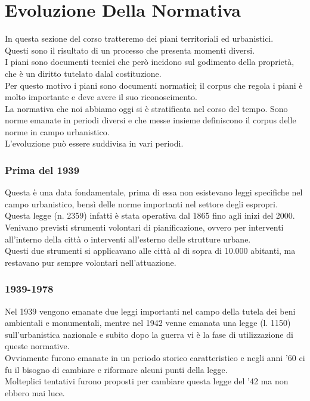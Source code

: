 \documentclass[a4paper,12pt, oneside]{book}
\begin{document}
\chapter{Evoluzione Della Normativa}
In questa sezione del corso tratteremo dei piani territoriali ed urbanistici.\\
Questi sono il risultato di un processo che presenta momenti diversi.\\
I piani sono documenti tecnici che però incidono sul godimento della proprietà, che è un diritto tutelato dalal costituzione.\\
Per questo motivo i piani sono documenti normatici; il corpus che regola i piani è molto importante e deve avere il suo riconoscimento.\\
La normativa che noi abbiamo oggi si è stratificata nel corso del tempo. Sono norme emanate in periodi diversi e che messe insieme definiscono il corpus delle norme in campo urbanistico.\\
L'evoluzione può essere suddivisa in vari periodi. 
\subsection{Prima del 1939}
Questa è una data fondamentale, prima di essa non esistevano leggi specifiche nel campo urbanistico, bensì delle norme importanti nel settore degli espropri.\\
Questa legge (n. 2359) infatti è stata operativa dal 1865 fino agli inizi del 2000.\\
Venivano previsti strumenti volontari di pianificazione, ovvero per interventi all'interno della città o interventi all'esterno delle strutture urbane.\\
Questi due strumenti si applicavano alle città al di sopra di 10.000 abitanti, ma restavano pur sempre volontari nell'attuazione.\\
\subsection{1939-1978}
Nel 1939 vengono emanate due leggi importanti nel campo della tutela dei beni ambientali e monumentali, mentre nel 1942 
venne emanata una legge (l. 1150) sull'urbanistica nazionale e subito dopo la guerra vi è la fase di utilizzazione di queste normative.\\
Ovviamente furono emanate in un periodo storico caratteristico e negli anni '60 ci fu il bisogno di cambiare e riformare alcuni punti della legge.\\
Molteplici tentativi furono proposti per cambiare questa legge del '42 ma non ebbero mai luce.\\
\end{document}
